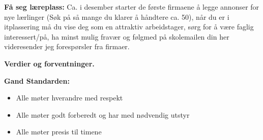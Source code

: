 \documentclass[12pt,a4paper]{book}
\begin{document}
\noindent
{\bf Få seg læreplass:} Ca. i desember starter de første firmaene å legge annonser for nye lærlinger (Søk på så mange du klarer å håndtere ca. 50), når du er i itplassering må du vise deg som en attraktiv arbeidstager, sørg for å være faglig interessert/på, ha minst mulig fravær og følgmed på skolemailen din her videresender jeg forespørsler fra firmaer. 
\vskip 10pt


\vfil

\eject



\centerline{\bf Verdier og forventninger. } \bigskip 


\noindent
{\bf Gand Standarden:}    
\begin{itemize}
\item{} Alle møter hverandre med respekt
\item{} Alle møter godt forberedt og har med nødvendig utstyr
\item{} Alle møter presis til timene
\end{itemize}
\vskip 10pt
\end{document}
